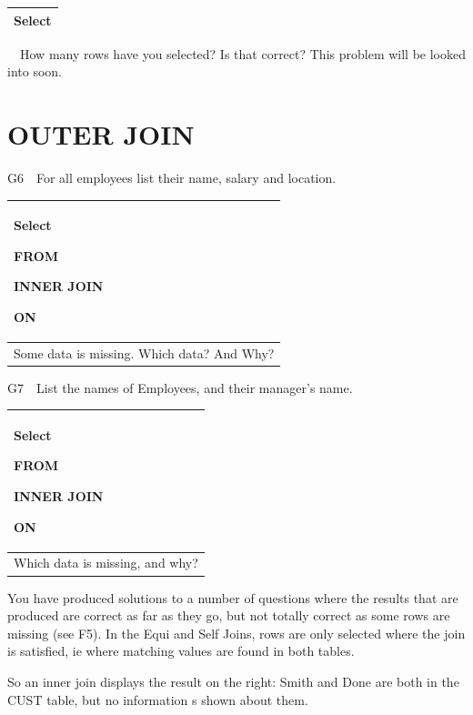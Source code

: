 \begin{flushleft}
\tablefirsthead{}
\tablehead{}
\tabletail{}
\tablelasttail{}
\begin{supertabular}{|m{14.793cm}|}
\hline
Select

\\\hline
\end{supertabular}
\end{flushleft}
\ \ How many rows have you selected?  Is that correct?  This problem will be looked into soon.

\section{OUTER JOIN}
G6\ \ For all employees list their name, salary and location.

\begin{flushleft}
\tablefirsthead{}
\tablehead{}
\tabletail{}
\tablelasttail{}
\begin{supertabular}{|m{14.583cm}|}
\hline
Select

FROM

INNER JOIN

ON\\\hline
Some data is missing. Which data? And Why?

\\\hline
\end{supertabular}
\end{flushleft}
G7\ \ List the names of Employees, and their manager's name.  

\begin{flushleft}
\tablefirsthead{}
\tablehead{}
\tabletail{}
\tablelasttail{}
\begin{supertabular}{|m{14.583cm}|}
\hline
Select

FROM

INNER JOIN

ON\\\hline
Which data is missing, and why?

\\\hline
\end{supertabular}
\end{flushleft}
You have produced solutions to a number of questions where the results that are produced are correct as far as they go, but not totally correct as some rows are missing (see F5).  In the Equi and Self Joins, rows are only selected where the join is satisfied, ie where matching values are found in both tables.

So an inner join displays the result on the right: Smith and Done are both in the CUST table, but no information s shown about them.

